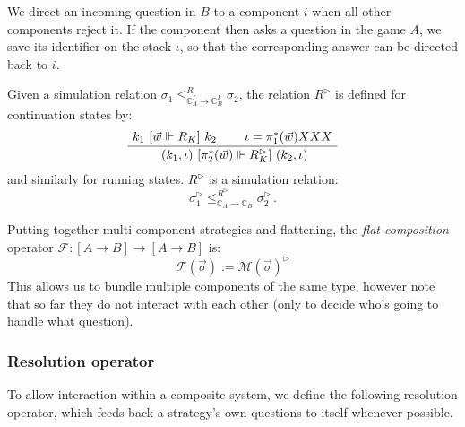 We direct an incoming question in $B$
to a component $i$ when all other components reject it.
If the component then asks a question in the game $A$,
we save its identifier on the stack $\iota$,
so that the corresponding answer can be directed back to $i$.

\begin{lemma}
Given a simulation relation
$\sigma_1 \le_{\mathbb{C}_A^I \rightarrow \mathbb{C}_B^I}^R \sigma_2$,
the relation $R^\rhd$ is defined for continuation states by:
\[
  \AxiomC{$k_1 \ifr{\vec{w} \Vdash R_K} k_2$}
  \AxiomC{$\iota = \pi_1^*(\vec{w}) \mbox{ XXX}$}
  \BinaryInfC{
    $(k_1, \iota) \ifr{\pi_2^*(\vec{w}) \Vdash R^\rhd_K} (k_2, \iota)$}
  \DisplayProof
\]
and similarly for running states.
$R^\rhd$ is a simulation relation:
\[
    \sigma_1^\rhd
    \le_{\mathbb{C}_A \rightarrow \mathbb{C}_B}^{R^\rhd}
    \sigma_2^\rhd \,.
\]
\end{lemma}

Putting together multi-component strategies and flattening,
the \emph{flat composition} operator
$\mathcal{F} : [A \rightarrow B] \rightarrow [A \rightarrow B]$
is:
\[
    \mathcal{F}(\vec{\sigma}) := \mathcal{M}(\vec{\sigma})^\rhd
\]
This allows us to bundle multiple components of the same type,
however note that so far they do not interact with each other
(only to decide who's going to handle what question).


\subsubsection{Resolution operator} %

To allow interaction within a composite system,
we define the following resolution operator,
which feeds back a strategy's own questions to itself
whenever possible.

